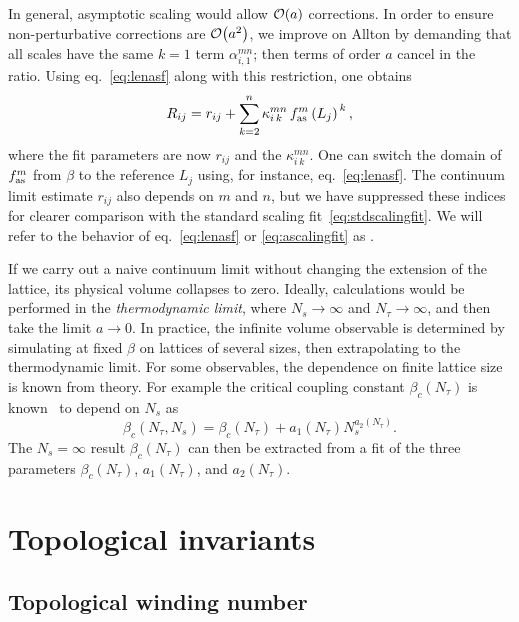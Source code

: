 In general, asymptotic scaling would allow $\order{a}$ corrections. 
In order to ensure non-perturbative corrections are 
$\order{a^2}$, we improve on Allton by demanding that 
all scales have the
same $k=1$ term $\alpha^{mn}_{i,1}$; then terms of order $a$ cancel 
in the ratio. Using eq.~\eqref{eq:lenasf} along with this restriction, 
one obtains
\begin{equation}\label{eq:ascalingfit}
  R_{ij}=r_{ij}+\sum_{k=2}^n\kappa^{mn}_{i\,k}
                  \,f_{\text{as}}^m\left(L_j\right)^{\,k},
\end{equation}
where the fit parameters are now $r_{ij}$ and the $\kappa_{i\,k}^{mn}$.
One can switch the domain of $f_{\text{as}}^m$ from $\beta$ to the
reference $L_j$ using, for instance, eq.~\eqref{eq:lenasf}.
The continuum limit estimate $r_{ij}$ also depends on $m$ and $n$, but
we have suppressed these indices for clearer comparison with
the standard scaling fit~\eqref{eq:stdscalingfit}. We will refer
to the behavior of eq.~\eqref{eq:lenasf} or \eqref{eq:ascalingfit}
as .

If we carry out a naive continuum limit without changing the
extension of the lattice, its physical volume collapses to zero.
Ideally, calculations would be performed in the {\it thermodynamic limit},
where $N_s\to\infty$ and $N_\tau\to\infty$, and then take the limit
$a\to0$. In practice, the infinite volume observable is determined
by simulating at fixed $\beta$ on lattices of several sizes, then
extrapolating to the thermodynamic limit.
For some observables, the dependence on finite lattice size is known
from theory. For example the critical coupling constant $\beta_c(N_\tau)$
is known~\cite{engels_critical_1996} to depend on $N_s$ as
\begin{equation}
  \beta_c(N_\tau,N_s)=\beta_c(N_\tau)+a_1(N_\tau)N_s^{a_2(N_\tau)}.
\end{equation}
The $N_s=\infty$ result $\beta_c(N_\tau)$ can then
be extracted from a fit of the three parameters $\beta_c(N_\tau)$,
$a_1(N_\tau)$, and $a_2(N_\tau)$.

\section{Topological invariants}\label{sec:topinvar}

\subsection{Topological winding number}

